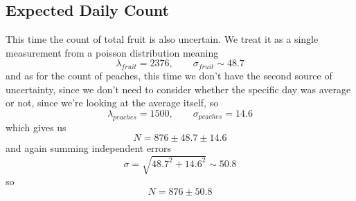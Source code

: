 \subsection{Expected Daily Count}
This time the count of total fruit is also uncertain. We treat it as a single measurement from a poisson distribution meaning 
\begin{equation}
    \lambda_{fruit}=2376,\qquad \sigma_{fruit}\sim48.7
\end{equation}
and as for the count of peaches, this time we don't have the second source of uncertainty, since we don't need to consider whether the specific day was average or not, since we're looking at the average itself, so 
\begin{equation}
    \lambda_{peaches}=1500,\qquad\sigma_{peaches}=14.6
\end{equation}
which gives us 
\begin{equation}
    N=876\pm48.7\pm14.6
\end{equation}
and again summing independent errors
\begin{equation}
    \sigma=\sqrt{48.7^2+14.6^2}\sim50.8
\end{equation}
so 
\begin{equation}
    N = 876\pm50.8
\end{equation}